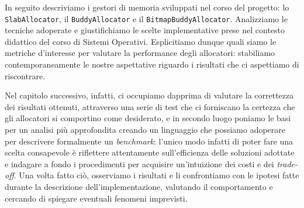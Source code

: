 In seguito descriviamo i gestori di memoria sviluppati nel corso del progetto: lo \texttt{SlabAllocator}, il \texttt{BuddyAllocator} e il \texttt{BitmapBuddyAllocator}. Analizziamo le tecniche adoperate e giustifichiamo le scelte implementative prese nel contesto didattico del corso di Sistemi Operativi. Esplicitiamo dunque quali siamo le metriche d'interesse per valutare la performance degli allocatori: stabiliamo contemporaneamente le nostre aspettative riguardo i risultati che ci aspettiamo di riscontrare.

Nel capitolo successivo, infatti, ci occupiamo dapprima di valutare la correttezza dei risultati ottenuti, attraverso una serie di test che ci forniscano la certezza che gli allocatori si comportino come desiderato, e in secondo luogo poniamo le basi per un analisi più approfondita creando un linguaggio che possiamo adoperare per descrivere formalmente un \textit{benchmark}: l'unico modo infatti di poter fare una scelta consapevole è riflettere attentamente sull'efficienza delle soluzioni adottate e indagare a fondo i procedimenti per acquisire un'intuizione dei costi e dei \textit{trade-off}.
Una volta fatto ciò, osserviamo i risultati e li confrontiamo con le ipotesi fatte durante la descrizione dell'implementazione, valutando il comportamento e cercando di spiegare eventuali fenomeni imprevisti. 